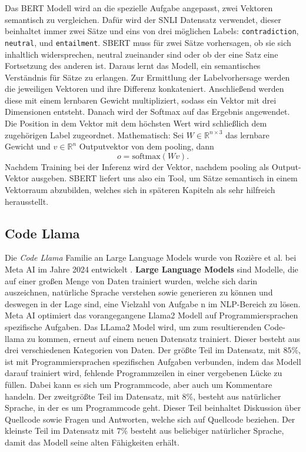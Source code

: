 \documentclass[12pt,letterpaper,ngerman]{article}
\begin{document}
Das BERT Modell wird an die spezielle Aufgabe 
angepasst, zwei Vektoren semantisch zu vergleichen. 
Dafür wird der SNLI Datensatz verwendet, dieser beinhaltet immer 
zwei Sätze und eins von drei möglichen Labels: 
\verb|contradiction|, \verb|neutral|, und \verb|entailment|.
SBERT muss für zwei Sätze vorhersagen, ob sie sich inhaltlich widersprechen,
neutral zueinander sind oder ob der eine Satz eine Fortsetzung des 
anderen ist. Daraus lernt das Modell, ein semantisches Verständnis 
für Sätze zu erlangen. Zur Ermittlung der Labelvorhersage werden die 
jeweiligen Vektoren und ihre Differenz konkateniert. Anschließend 
werden diese mit einem lernbaren Gewicht multipliziert, sodass ein 
Vektor mit drei Dimensionen entsteht. Danach wird der Softmax auf das
Ergebnis angewendet. Die Position in dem Vektor mit dem höchsten Wert 
wird schließlich dem zugehörigen Label zugeordnet. Mathematisch:
Sei $W \in \mathbb{R}^{n\times 3}$ das lernbare Gewicht und 
$v \in \mathbb{R}^n$ Outputvektor von dem pooling, dann
\[
  o = \text{softmax}(Wv).
\]
Nachdem Training bei der Inferenz wird der Vektor, nachdem pooling 
als Output-Vektor ausgeben. SBERT liefert uns also ein Tool, 
um Sätze semantisch in einem Vektorraum abzubilden,
welches sich in späteren Kapiteln als sehr hilfreich herausstellt.
\pagebreak
\subsection{Code Llama}
Die \textit{Code Llama} Familie an Large Language Models wurde von 
Rozière et al. bei Meta AI im Jahre 2024 entwickelt
\cite{rozière2024codellamaopenfoundation}.
{\bf Large Language Models} sind Modelle, die auf
einer großen Menge von Daten trainiert wurden, welche sich darin
auszeichnen, natürliche Sprache verstehen sowie generieren zu
können und deswegen in der Lage sind, eine Vielzahl von Aufgabe
n im NLP-Bereich zu lösen.\\

Meta AI optimiert das vorangegangene Llama2 Modell auf
Programmiersprachen spezifische Aufgaben. Das LLama2 Model wird,
um zum resultierenden Code-llama zu kommen, erneut auf einem neuen
Datensatz trainiert. Dieser besteht aus drei verschiedenen 
Kategorien von Daten. Der größte Teil im Datensatz, mit $85 \%$,
ist mit Programmiersprachen spezifischen Aufgaben verbunden,
indem das Modell darauf trainiert wird, fehlende Programmzeilen in 
einer vergebenen Lücke zu füllen. Dabei kann es sich um Programmcode,
aber auch um Kommentare handeln. Der zweitgrößte Teil im Datensatz,
mit $8 \%$, besteht aus natürlicher Sprache, in der es um 
Programmcode geht. Dieser Teil beinhaltet Diskussion über Quellcode
sowie Fragen und Antworten, welche sich auf Quellcode beziehen. 
Der kleinste Teil im Datensatz mit $7 \%$ besteht aus beliebiger 
natürlicher Sprache, damit das Modell seine alten Fähigkeiten erhält. \\
\end{document}
